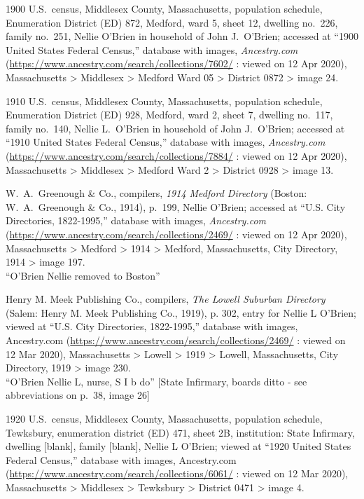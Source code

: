 \begin{thebibliography}{999}
1900 U.S.\ census, Middlesex County, Massachusetts, population schedule, Enumeration District (ED) 872, Medford, ward 5, sheet 12, dwelling no.\ 226, family no.\ 251, Nellie O'Brien in household of John J.\ O'Brien; accessed at ``1900 United States Federal Census,'' database with images, \textit{Ancestry.com} (\url{https://www.ancestry.com/search/collections/7602/} : viewed on 12 Apr 2020), Massachusetts > Middlesex > Medford Ward 05 > District 0872 > image 24.

1910 U.S.\ census, Middlesex County, Massachusetts, population schedule, Enumeration District (ED) 928, Medford, ward 2, sheet 7, dwelling no.\ 117, family no.\ 140, Nellie L.\ O'Brien in household of John J.\ O'Brien; accessed at ``1910 United States Federal Census,'' database with images, \textit{Ancestry.com} (\url{https://www.ancestry.com/search/collections/7884/} : viewed on 12 Apr 2020), Massachusetts > Middlesex > Medford Ward 2 > District 0928 > image 13.

W.\ A.\ Greenough \& Co., compilers, \textit{1914 Medford Directory} (Boston: W.\ A.\ Greenough \& Co., 1914), p.\ 199, Nellie O'Brien; accessed at ``U.S. City Directories, 1822-1995,'' database with images, \textit{Ancestry.com} (\url{https://www.ancestry.com/search/collections/2469/} : viewed on 12 Apr 2020), Massachusetts > Medford > 1914 > Medford, Massachusetts, City Directory, 1914 > image 197.\\
``O'Brien Nellie removed to Boston''

Henry M. Meek Publishing Co., compilers, \textit{The Lowell Suburban Directory} (Salem: Henry M. Meek Publishing Co., 1919), p. 302, entry for Nellie L O'Brien; viewed at ``U.S. City Directories, 1822-1995,'' database with images, Ancestry.com (\url{https://www.ancestry.com/search/collections/2469/} : viewed on 12 Mar 2020), Massachusetts > Lowell > 1919 > Lowell, Massachusetts, City Directory, 1919 > image 230.\\
``O'Brien Nellie L, nurse, S I b do'' [State Infirmary, boards ditto - see abbreviations on p.\ 38, image 26]

1920 U.S.\ census, Middlesex County, Massachusetts, population schedule, Tewksbury, enumeration district (ED) 471, sheet 2B, institution: State Infirmary, dwelling [blank], family [blank], Nellie L O'Brien; viewed at ``1920 United States Federal Census,'' database with images, Ancestry.com (\url{https://www.ancestry.com/search/collections/6061/} : viewed on 12 Mar 2020), Massachusetts > Middlesex > Tewksbury > District 0471 > image 4.


\end{thebibliography}
